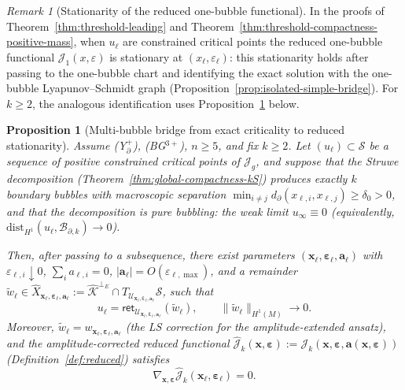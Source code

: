 \documentclass[11pt,reqno,a4paper]{amsart}
\numberwithin{equation}{section}
\theoremstyle{plain}
\newtheorem{proposition}[theorem]{Proposition}
\theoremstyle{remark}
\newtheorem{remark}[theorem]{Remark}
\theoremstyle{plain}
\begin{document}
\begin{remark}[Stationarity of the reduced one-bubble functional]\label{rem:threshold-bridge-use}
In the proofs of Theorem~\ref{thm:threshold-leading} and
Theorem~\ref{thm:threshold-compactness-positive-mass},
when $u_\ell$ are constrained critical points the reduced one-bubble
functional $\mathcal J_1(x,\varepsilon)$ is stationary at $(x_\ell,\varepsilon_\ell)$:
this stationarity holds after passing to the one-bubble chart and identifying
the exact solution with the one-bubble Lyapunov--Schmidt graph
(Proposition~\ref{prop:isolated-simple-bridge}).
For $k\ge2$, the analogous identification uses
Proposition~\ref{prop:multibubble-bridge} below.
\end{remark}

\begin{proposition}[Multi-bubble bridge from exact criticality to reduced stationarity]
\label{prop:multibubble-bridge}
Assume \textup{(Y$^+_{\partial}$)}, \textup{(BG$^{3+}$)}, $n\ge5$, and fix $k\ge2$.
Let $(u_\ell)\subset\mathcal S$ be a sequence of positive constrained critical points of $\mathcal J_g$,
and suppose that the Struwe decomposition (Theorem~\ref{thm:global-compactness-kS}) produces
exactly $k$ boundary bubbles with macroscopic separation
$\min_{i\neq j}d_\partial(x_{\ell,i},x_{\ell,j})\ge\delta_0>0$,
and that the decomposition is \emph{pure bubbling}: the weak limit $u_\infty\equiv0$
(equivalently, $\mathrm{dist}_{H^1}(u_\ell,\mathcal B_{\partial,k})\to0$).

Then, after passing to a subsequence, there exist parameters
$(\mathbf x_\ell,\boldsymbol\varepsilon_\ell,\mathbf a_\ell)$ with
$\varepsilon_{\ell,i}\downarrow0$, $\sum_i a_{\ell,i}=0$, $|\mathbf a_\ell|=O(\varepsilon_{\ell,\max})$,
and a remainder
$\widetilde w_\ell\in
\widehat X_{\mathbf x_\ell,\boldsymbol\varepsilon_\ell,\mathbf a_\ell}
:=\widehat{\mathcal K}^{\perp_E}
\cap T_{\mathcal U_{\mathbf x_\ell,\boldsymbol\varepsilon_\ell,\mathbf a_\ell}}\mathcal S$,
such that
\[
u_\ell=\mathsf{ret}_{\mathcal U_{\mathbf x_\ell,\boldsymbol\varepsilon_\ell,\mathbf a_\ell}}
(\widetilde w_\ell),
\qquad
\|\widetilde w_\ell\|_{H^1(M)}\to0.
\]
Moreover, $\widetilde w_\ell=w_{\mathbf x_\ell,\boldsymbol\varepsilon_\ell,\mathbf a_\ell}$
(the LS correction for the amplitude-extended ansatz), and
the amplitude-corrected reduced functional
$\hat{\mathcal J}_k(\mathbf x,\boldsymbol\varepsilon)
:=\mathcal J_k(\mathbf x,\boldsymbol\varepsilon,\mathbf a(\mathbf x,\boldsymbol\varepsilon))$
(Definition~\ref{def:reduced}) satisfies
\begin{equation}\label{eq:multibubble-exact-stat}
\nabla_{\mathbf x,\boldsymbol\varepsilon}\hat{\mathcal J}_k
(\mathbf x_\ell,\boldsymbol\varepsilon_\ell)=0.
\end{equation}
\end{proposition}
\end{document}
